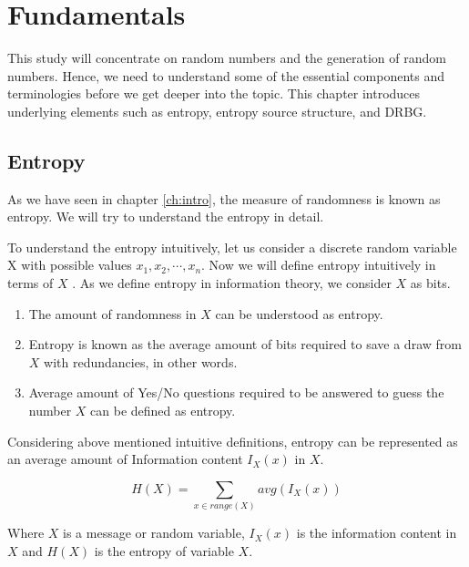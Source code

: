 \chapter{Fundamentals}
\label{ch:fundamentals}

This study will concentrate on random numbers and the generation of random numbers. Hence, we need to understand some of the essential components and terminologies before we get deeper into the topic. This chapter introduces underlying elements such as entropy, entropy source structure, and DRBG.

%
%
\section{Entropy}
\label{sec:fundamentals:entropy}
As we have seen in chapter \ref{ch:intro}, the measure of randomness is known as entropy. We will try to understand the entropy in detail.

To understand the entropy intuitively, let us consider a discrete random variable X with possible values $x_{1}, x_{2}, \cdots, x_{n}$. Now we will define entropy intuitively in terms of $X$ \cite{Lec20IT-2013}. As we define entropy in information theory, we consider $X$ as bits. 

\begin{enumerate}
	\item The amount of randomness in $X$ can be understood as entropy.
	
	\item Entropy is known as the average amount of bits required to save a draw from $X$ with redundancies, in other words.
	
	\item Average amount of Yes/No questions required to be answered to guess the number $X$ can be defined as entropy.
\end{enumerate}

Considering above mentioned intuitive definitions, entropy can be represented as an average amount of Information content $I_{X}(x)$ in $X$. 

\begin{equation}
\label{eq:2:1}
H(X) = \sum_{x \in range(X)}  avg(I_{X}(x))
\end{equation}

Where $X$ is a message or random variable, $I_{X}(x)$ is the information content in $X$ and $H(X)$ is the entropy of variable $X$.

%
%
